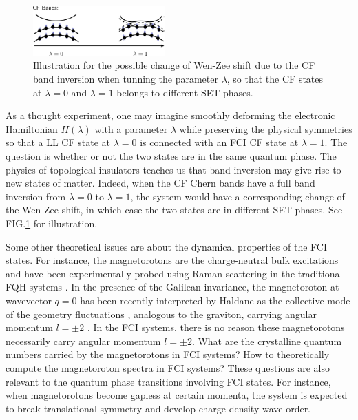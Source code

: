 \begin{figure}[!htp]
    \centering
    \includegraphics[width=0.45\textwidth]{figures/FCI/CF_band_Wen-Zee_shift_transition.pdf}
    \caption{Illustration for the possible change of Wen-Zee shift due to the CF band inversion when tunning the parameter $\lambda$, so that the CF states at $\lambda=0$ and $\lambda=1$ belongs to different SET phases.}
    \label{fig:CF band inversion}
\end{figure}

As a thought experiment, one may imagine smoothly deforming the electronic Hamiltonian $H(\lambda)$ with a parameter $\lambda$ while preserving the physical symmetries so that a LL CF state at $\lambda=0$ is connected with an FCI CF state at $\lambda=1$. The question is whether or not the two states are in the same quantum phase.  The physics of topological insulators teaches us that band inversion may give rise to new states of matter. Indeed, when the CF Chern bands have a full band inversion from $\lambda=0$ to $\lambda=1$, the system would have a corresponding change of the Wen-Zee shift, in which case the two states are in different SET phases. See FIG.\ref{fig:CF band inversion} for illustration.


Some other theoretical issues are about the dynamical properties of the FCI states. For instance, the magnetorotons are the charge-neutral bulk excitations and have been experimentally probed using Raman scattering in the traditional FQH systems \cite{pinczuk1998light,kang2000inelastic,kukushkin2009dispersion}. In the presence of the Galilean invariance, the magnetoroton at wavevector $q=0$ has been recently interpreted by Haldane as the collective mode of the geometry fluctuations \cite{haldane2011geometrical,haldane2009hall}, analogous to the graviton, carrying angular momentum $l=\pm 2$ \cite{yang2012model}.  In the FCI systems, there is no reason these magnetorotons necessarily carry angular momentum  $l=\pm 2$. What are the crystalline quantum numbers carried by the magnetorotons in FCI systems? How to theoretically compute the magnetoroton spectra in FCI systems? These questions are also relevant to the quantum phase transitions involving FCI states. For instance, when magnetorotons become gapless at certain momenta, the system is expected to break translational symmetry and develop charge density wave order.


